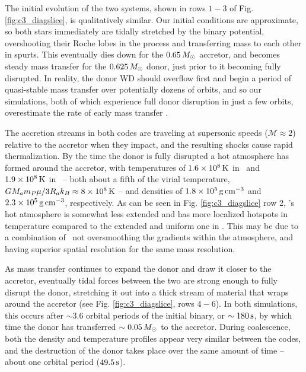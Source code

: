 The initial evolution of the two systems, shown in rows $1-3$ of Fig. \ref{fig:c3_diagslice}, is qualitatively similar.  Our initial conditions are approximate, so both stars immediately are tidally stretched by the binary potential, overshooting their Roche lobes in the process and transferring mass to each other in spurts.  This eventually dies down for the $0.65\,\Msun$ accretor, and becomes steady mass transfer for the $0.625\,\Msun$ donor, just prior to it becoming fully disrupted.  In reality, the donor WD should overflow first and begin a period of quasi-stable mass transfer over potentially dozens of orbits, and so our simulations, both of which experience full donor disruption in just a few orbits, overestimate the rate of early mass transfer \citep{dan+11}.


The accretion streams in both codes are traveling at supersonic speeds ($\mathcal{M} \approx 2$) relative to the accretor when they impact, and the resulting shocks cause rapid thermalization.  By the time the donor is fully disrupted a hot atmosphere has formed around the accretor, with temperatures of $1.6 \times 10^8\,\mathrm{K}$ in  \arepo\ and $1.9\times 10^8\,\mathrm{K}$ in \gasoline\ -- both about a fifth of the virial temperature, $GM_am_P\mu/3R_ak_B \approx 8 \times 10^8\,\mathrm{K}$ -- and densities of $1.8\times10^5\,\gcc$ and $2.3\times10^5\,\gcc$, respectively.  As can be seen in Fig. \ref{fig:c3_diagslice} row 2, \arepo's hot atmosphere is somewhat less extended and has more localized hotspots in temperature compared to the extended and uniform one in \gasoline.  This may be due to a combination of \arepo\ not oversmoothing the gradients within the atmosphere, and having superior spatial resolution for the same mass resolution.


As mass transfer continues to expand the donor and draw it closer to the accretor, eventually tidal forces between the two are strong enough to fully disrupt the donor, stretching it out into a thick stream of material that wraps around the accretor (see Fig. \ref{fig:c3_diagslice}, rows $4-6$).  In both simulations, this occurs after $\sim3.6$ orbital periods of the initial binary, or $\sim180\,\mathrm{s}$, by which time the donor has transferred $\sim0.05\,\Msun$ to the accretor.  During coalescence, both the density and temperature profiles appear very similar between the codes, and the destruction of the donor takes place over the same amount of time -- about one orbital period ($49.5\,\mathrm{s}$).

